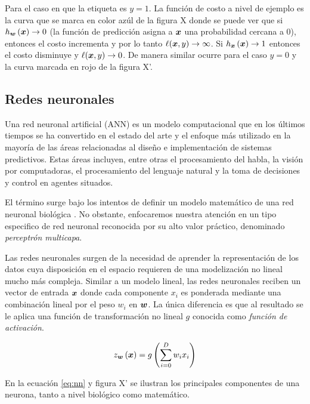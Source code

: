 Para el caso en que la etiqueta es $y = 1$. La función de costo a nivel de
ejemplo es la curva que se marca en color azúl de la figura X donde se puede ver
que si $h_{\boldsymbol{w}}\left( \boldsymbol{x} \right) \rightarrow 0$ (la función de
predicción asigna a $\boldsymbol{x}$ una probabilidad cercana a $0$), entonces el
costo incrementa y por lo tanto $\ell(\boldsymbol{x}, y) \rightarrow \infty$. Si
$h_{\boldsymbol{x}}\left( \boldsymbol{x} \right) \rightarrow 1$ entonces el costo disminuye
y $\ell(\boldsymbol{x}, y) \rightarrow 0$. De manera similar ocurre para el caso $y =
0$ y la curva marcada en rojo de la figura X'.

\subsection{Redes neuronales}

Una red neuronal artificial (ANN) es un modelo computacional que en los últimos
tiempos se ha convertido en el estado del arte y el enfoque más utilizado en la
mayoría de las áreas relacionadas al diseño e implementación de sistemas
predictivos. Estas áreas incluyen, entre otras el procesamiento del habla, la
visión por computadoras, el procesamiento del lenguaje natural y la toma de
decisiones y control en agentes situados.

El término surge bajo los intentos de definir un modelo matemático de una red
neuronal biológica \citep{}. No obstante, enfocaremos nuestra atención en un tipo
especifico de red neuronal reconocida por su alto valor práctico, denominado
\emph{perceptrón multicapa}.

Las redes neuronales surgen de la necesidad de aprender la representación de los
datos cuya disposición en el espacio requieren de una modelización no lineal
mucho más compleja. Similar a un modelo lineal, las redes neuronales reciben un
vector de entrada $\boldsymbol{x}$ donde cada componente $x_i$ es ponderada mediante
una combinación lineal por el peso $w_i$ en $\boldsymbol{w}$. La única diferencia es que
al resultado se le aplica una función de transformación no lineal $g$ conocida
como \emph{función de activación}.

\begin{equation} \label{eq:nn}
    z_{\boldsymbol{w}}\left( \boldsymbol{x} \right) = g\left( \sum_{i=0}^{D} w_i x_i \right)
\end{equation}

En la ecuación \ref{eq:nn} y figura X' se ilustran los principales componentes de una
neurona, tanto a nivel biológico como matemático.

